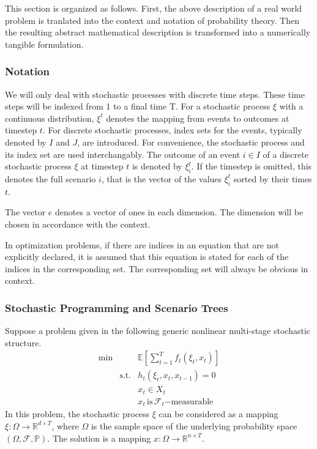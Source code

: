 \documentclass[a4paper, 12pt] {article}
\begin{document}
This section is organized as follows. First, the above description of a real world problem is tranlated into the context and notation of probability theory. Then the resulting abstract mathematical description is transformed into a numerically tangible formulation.
\subsubsection{Notation}
We will only deal with stochastic processes with discrete time steps. These time steps will be indexed from 1 to a final time T. For a stochastic process $\xi$ with a continuous distribution, $\xi^t$ denotes the mapping from events to outcomes at timestep $t$. For discrete stochastic processes, index sets for the events, typically denoted by $I$ and $J$, are introduced. For convenience, the stochastic process and its index set are used interchangably. The outcome of an event $i\in I$ of a discrete stochastic process $\xi$ at timestep $t$ is denoted by $\xi_i^t$. If the timestep is omitted, this denotes the full scenario $i$, that is the vector of the values $\xi_i^t$ sorted by their times $t$.

The vector $e$ denotes a vector of ones in each dimension. The dimension will be chosen in accordance with the context. 

In optimization problems, if there are indices in an equation that are not explicitly declared, it is assumed that this equation is stated for each of the indices in the corresponding set.
The corresponding set will always be obvious in context.
\subsubsection{Stochastic Programming and Scenario Trees}
Suppose a problem given in the following generic nonlinear multi-stage stochastic structure. 
\begin{eqnarray}
  \label{eq:genericSP}
  \min &&\mathbb{E}\left[\sum_{t=1}^Tf_t(\xi_t, x_t)\right]\\
  &\mathrm{s.t.}& h_t(\xi_t, x_t, x_{t-1}) = 0\\
  &&x_t \in X_t\\
  &&x_t \, \mathrm{is}\,\mathcal{F}_t \mathrm{-measurable} \label{eqn:measurability-constraint}
\end{eqnarray}
In this problem, the stochastic process $\xi$ can be considered as a mapping $\xi:\Omega\rightarrow \mathbb{R}^{d\times T}$, where $\Omega$ is the sample space of the underlying probability space $(\Omega, \mathcal{F}, \mathbb{P})$. The solution is a mapping $x:\Omega\rightarrow \mathbb{R}^{n\times T}$.
\end{document}
